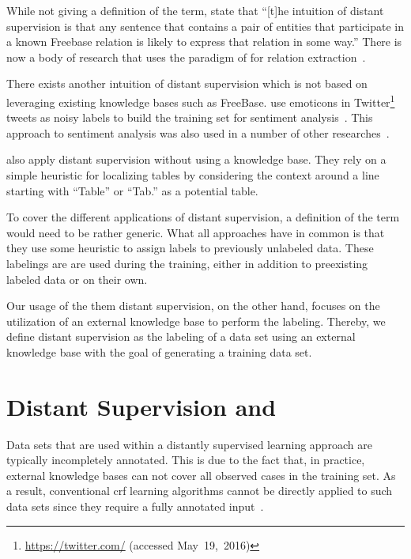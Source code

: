 While not giving a definition of the term, \citet{mintz2009distant} state that ``[t]he intuition of distant supervision is that any sentence that contains a pair of entities that participate in a known Freebase relation is likely to express that relation in some way.''
There is now a body of research that uses the paradigm of \citet{mintz2009distant} for relation extraction~\citep{benson2011event,ritter2011named,nguyen2011end,takamatsu2012reducing,xu2013filling}.

\bigskip

There exists another intuition of \gls{distant supervision} which is not based on leveraging existing knowledge bases such as FreeBase.
\citet{go2009twitter} use emoticons in Twitter\footnote{\url{https://twitter.com/} (accessed May~19,~2016)} tweets as noisy labels to build the training set for sentiment analysis~\citep{go2009twitter}.
This approach to sentiment analysis was also used in a number of other researches~\citep{purver2012experimenting,marchetti2012learning,suttles2013distant}.

\citet{fan2015detecting} also apply distant supervision without using a knowledge base.
They rely on a simple heuristic for localizing tables by considering the context around a line starting with ``Table'' or ``Tab.'' as a potential table.

\bigskip

To cover the different applications of \gls{distant supervision}, a definition of the term would need to be rather generic.
What all approaches have in common is that they use some heuristic to assign labels to previously unlabeled data. These labelings are are used during the training, either in addition to preexisting labeled data or on their own.

Our usage of the them \gls{distant supervision}, on the other hand, focuses on the utilization of an external knowledge base to perform the labeling.
Thereby, we define \gls{distant supervision} as the labeling of a data set using an external knowledge base with the goal of generating a training data set.

\section{Distant Supervision and }

Data sets that are used within a distantly supervised learning approach are typically incompletely annotated.
This is due to the fact that, in practice, external knowledge bases can not cover all observed cases in the training set.
As a result, conventional \gls{crf} learning algorithms cannot be directly applied to such data sets since they require a fully annotated input~\citep{tsuboi2008training}.

